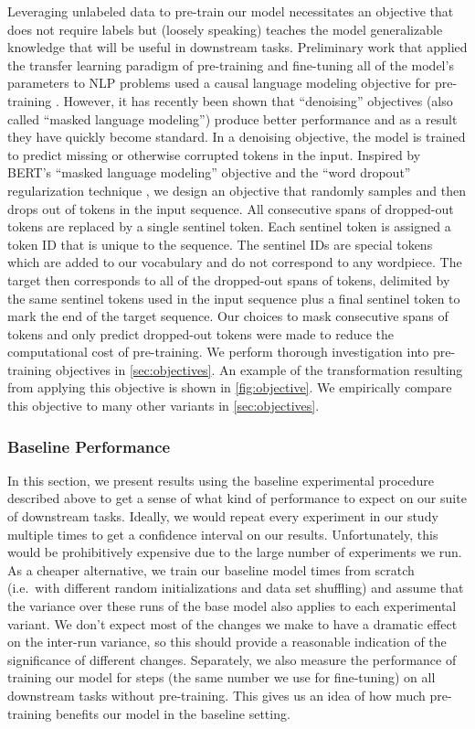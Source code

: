 \documentclass[twoside,11pt]{article}
\begin{document}
Leveraging unlabeled data to pre-train our model necessitates an objective that does not require labels but (loosely speaking) teaches the model generalizable knowledge that will be useful in downstream tasks.
Preliminary work that applied the transfer learning paradigm of pre-training and fine-tuning all of the model's parameters to NLP problems used a causal language modeling objective for pre-training \citep{dai2015semi,peters2018deep,radford2018improving,howard2018universal}.
However, it has recently been shown that ``denoising'' objectives \citep{devlin2018bert,taylor1953cloze} (also called ``masked language modeling'') produce better performance and as a result they have quickly become standard.
In a denoising objective, the model is trained to predict missing or otherwise corrupted tokens in the input.
Inspired by BERT's ``masked language modeling'' objective and the ``word dropout'' regularization technique \citep{bowman2015generating}, we design an objective that randomly samples and then drops out  of tokens in the input sequence.
All consecutive spans of dropped-out tokens are replaced by a single sentinel token.
Each sentinel token is assigned a token ID that is unique to the sequence.
The sentinel IDs are special tokens which are added to our vocabulary and do not correspond to any wordpiece.
The target then corresponds to all of the dropped-out spans of tokens, delimited by the same sentinel tokens used in the input sequence plus a final sentinel token to mark the end of the target sequence.
Our choices to mask consecutive spans of tokens and only predict dropped-out tokens were made to reduce the computational cost of pre-training.
We perform thorough investigation into pre-training objectives in \cref{sec:objectives}.
An example of the transformation resulting from applying this objective is shown in \cref{fig:objective}.
We empirically compare this objective to many other variants in \cref{sec:objectives}.

\subsubsection{Baseline Performance}

In this section, we present results using the baseline experimental procedure described above to get a sense of what kind of performance to expect on our suite of downstream tasks.
Ideally, we would repeat every experiment in our study multiple times to get a confidence interval on our results.
Unfortunately, this would be prohibitively expensive due to the large number of experiments we run.
As a cheaper alternative, we train our baseline model  times from scratch (i.e.\ with different random initializations and data set shuffling) and assume that the variance over these runs of the base model also applies to each experimental variant.
We don't expect most of the changes we make to have a dramatic effect on the inter-run variance, so this should provide a reasonable indication of the significance of different changes.
Separately, we also measure the performance of training our model for  steps (the same number we use for fine-tuning) on all downstream tasks without pre-training.
This gives us an idea of how much pre-training benefits our model in the baseline setting.
\end{document}
